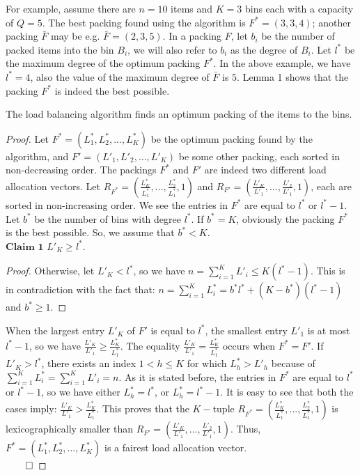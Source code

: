 \indent For example, assume there are $n=10$ items and $K=3$ bins each with a capacity of $Q=5$. The best packing found using the algorithm is $F^*=(3,3,4)$; another packing $\bar{F}$ may be e.g. $\bar{F}=(2,3,5)$. In a packing $F$, let $b_i$ be the number of packed items into the bin $B_i$, we will also refer to $b_i$ as the degree of $B_i$. Let $l^*$ be the maximum degree of the optimum packing $F^*$. In the above example, we have $l^*=4$, also the value of the maximum degree of $\bar{F}$ is $5$. Lemma 1 shows that the packing $F^*$ is indeed the best possible. 
\begin{lemma}The load balancing algorithm finds an optimum packing of the items to the bins. 
\end{lemma}
\begin{proof} Let  ${F^*} = (L_1^*,L_2^*,...,L_K^*)$ be the optimum packing found by the algorithm, and $F' = ({L'_1},{L'_2},...,{L'_K})$ be some other packing, each sorted in non-decreasing order. The packings $F^*$ and $F'$ are indeed two different load allocation vectors. Let ${R_{F^*}} = (\frac{L_K^*}{L_1^*},...,\frac{L_2^*}{L_1^*},1)$ and $R_{F'}= (\frac{L'_K}{L'_1},...,\frac{L'_2}{L'_1},1)$, each are sorted in non-increasing order. We see the entries in ${F^*}$ are equal to ${l^*}$ or ${l^*-1}$. Let $b^*$ be the number of bins with degree ${l^*}$. If ${b^*}=K$, obviously the packing ${F^*}$ is the best possible. So, we assume that ${b^*}<K$.\\

\noindent $\mathbf{Claim\,\,1} $ ${L'_K} \ge {l^*}$.
\begin{proof}Otherwise, let ${L'_K} < {l^*}$, so we have $n = \sum\nolimits_{i = 1}^K {L'_i}  \le K({l^*} - 1)$. This is in contradiction with the fact that: $n = \sum\nolimits_{i = 1}^K {L_i^*}  = {b^*}{l^*} + (K - {b^*})({l^*} - 1)$ and ${{b^*}} \ge 1$.
\end{proof}

\indent When the largest entry $L'_K$ of $F'$ is equal to $l^*$, the smallest entry $L'_1$ is at most $l^*- 1$, so we have $\frac{L'_K}{L'_1} \ge \frac{L_K^*}{L_1^*}$. The equality  $\frac{L'_K}{L'_1} = \frac{L_K^*}{L_1^*}$ occurs when $F^* = F'$. If ${L'_K} > {l^*}$, there exists an index $1 < h \le K$ for which $L_h^* > L'_h$ because of $\sum\nolimits_{i = 1}^K {L_i^*}  = \sum\nolimits_{i = 1}^K {L'_i}  = n$. As it is stated before, the entries in $F^*$ are equal to $l^*$ or $l^*-1$, so we have either $L_h^*=l^*$, or $L_h^*=l^*-1$. It is easy to see that both the cases imply: $\frac{L'_K}{L'_1} >\frac{ L_K^*}{L_1^*}$. This proves that the $K-$tuple $R_{F^*} = (\frac{L_K^*}{L_1^*},...,\frac{L_2^*}{L_1^*},1)$ is lexicographically smaller than $R_{F'}= (\frac{L'_K}{L'_1},...,\frac{L'_2}{L'_1},1)$. Thus, $F^*=(L_1^*,L_2^*,...,L_K^*)$ is a fairest load allocation vector.\\
 $\qed$
\end{proof}

